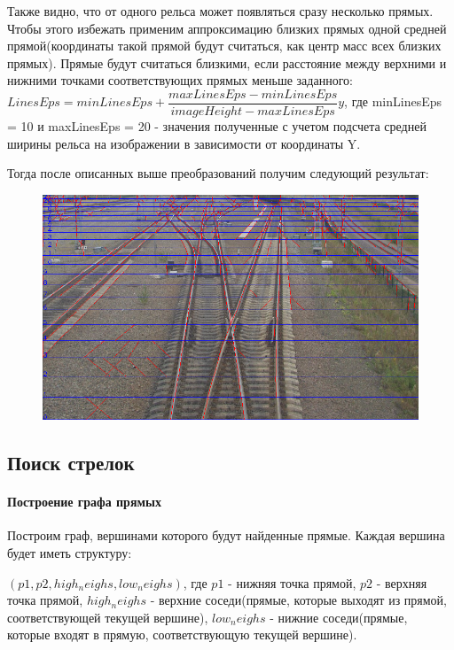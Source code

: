 Также видно, что от одного рельса может появляться сразу несколько прямых. Чтобы этого избежать применим аппроксимацию близких прямых одной средней прямой(координаты такой прямой будут считаться, как центр масс всех близких прямых). 
Прямые будут считаться близкими, если расстояние между верхними и нижними точками соответствующих прямых меньше заданного: \newline
$LinesEps = minLinesEps + \dfrac{maxLinesEps - minLinesEps}{imageHeight - maxLinesEps}y$, \newline 
где minLinesEps = 10 и maxLinesEps = 20 - значения полученные с учетом подсчета средней ширины рельса на изображении в зависимости от координаты Y.

Тогда после описанных выше преобразований получим следующий результат:
\begin{figure}[!h]
	\centering
	\includegraphics[width=0.9\linewidth]{pictures/screenshot0013}
	\caption{}
	\label{fig:screenshot0013}
\end{figure}

\subsection{Поиск стрелок}
\paragraph{Построение графа прямых}
\label{line_graph}

Построим граф, вершинами которого будут найденные прямые. Каждая вершина будет иметь структуру: 

$(p1, p2, high_neighs, low_neighs)$, где $p1$ - нижняя точка прямой, $p2$ - верхняя точка прямой, $high_neighs$ - верхние соседи(прямые, которые выходят из прямой, соответствующей текущей вершине), $low_neighs$ - нижние соседи(прямые, которые входят в прямую, соответствующую текущей вершине). 

